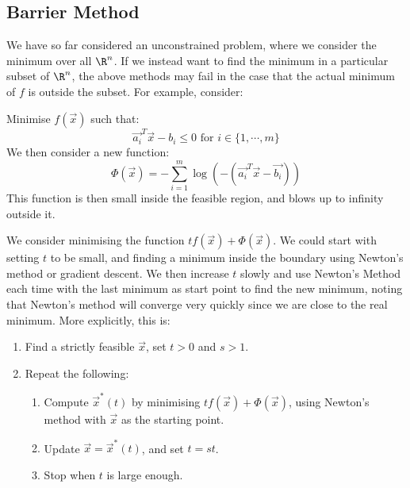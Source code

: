 \documentclass[../Main.tex]{subfiles}
\begin{document}
\subsection{Barrier Method}
We have so far considered an unconstrained problem, where we consider the minimum over all $\R^n$. If we instead want to find the minimum in a particular subset of $\R^n$, the above methods may fail in the case that the actual minimum of $f$ is outside the subset. For example, consider:

Minimise $f(\vec{x})$ such that:
\begin{equation*}
    \vec{a_i}^T \vec{x} - b_i \leq 0 \text{ for } i \in \{1, \cdots, m\}
\end{equation*}
We then consider a new function:
\begin{equation*}
    \Phi(\vec{x}) = -\sum_{i=1}^m \log\left(-\left(\vec{a_i}^T \vec{x} - \vec{b_i}\right)\right)
\end{equation*}
This function is then small inside the feasible region, and blows up to infinity outside it.

We consider minimising the function $tf(\vec{x}) + \Phi(\vec{x})$. We could start with setting $t$ to be small, and finding a minimum inside the boundary using Newton's method or gradient descent. We then increase $t$ slowly and use Newton's Method each time with the last minimum as start point to find the new minimum, noting that Newton's method will converge very quickly since we are close to the real minimum. More explicitly, this is:
\begin{enumerate}
    \item Find a strictly feasible $\vec{x}$, set $t > 0$ and $s > 1$.
    \item Repeat the following:
    \begin{enumerate}
        \item Compute $\vec{x}^*(t)$ by minimising $tf(\vec{x}) + \Phi(\vec{x})$, using Newton's method with $\vec{x}$ as the starting point.
        \item Update $\vec{x} = \vec{x}^*(t)$, and set $t = st$.
        \item Stop when $t$ is large enough.
    \end{enumerate}
\end{enumerate}
\end{document}
